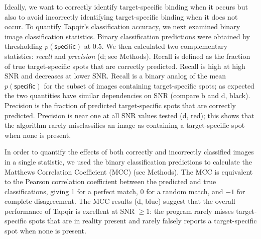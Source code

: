 Ideally, we want to correctly identify target-specific binding when it occurs but also to avoid incorrectly identifying target-specific binding when it does not occur. To quantify Tapqir's classification accuracy, we next examined binary image classification statistics. Binary classification predictions were obtained by thresholding $p(\mathsf{specific})$ at $0.5$. We then calculated two complementary statistics: \textit{recall} and \textit{precision} \citep{Fawcett2006-bq} (d; see Methods). Recall is defined as the fraction of true target-specific spots that are correctly predicted. Recall is high at high SNR and decreases at lower SNR. Recall is a binary analog of the mean $p(\mathsf{specific})$ for the subset of images containing target-specific spots; as expected the two quantities have similar dependencies on SNR (compare b and d, black). Precision is the fraction of predicted target-specific spots that are correctly predicted. Precision is near one at all SNR values tested (d, red); this shows that the algorithm rarely misclassifies an image as containing a target-specific spot when none is present. 

In order to quantify the effects of both correctly and incorrectly classified images in a single statistic, we used the binary classification predictions to calculate the Matthews Correlation Coefficient (MCC) \citep{Matthews1975-rw} (see Methods). The MCC is equivalent to the Pearson correlation coefficient between the predicted and true classifications, giving 1 for a perfect match, 0 for a random match, and $-1$ for complete disagreement. The MCC results (d, blue) suggest that the overall performance of Tapqir is excellent at SNR $\ge 1$: the program rarely misses target-specific spots that are in reality present and rarely falsely reports a target-specific spot when none is present.  

